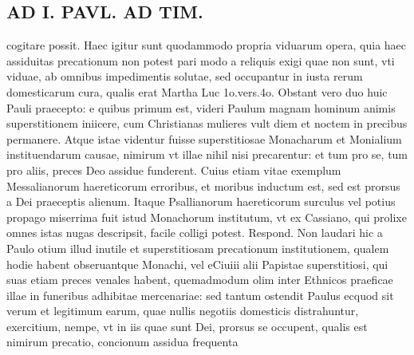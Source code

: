 \documentclass{article}
\begin{document}
\begin{pages}
\section*{AD I. PAVL. AD TIM. }
\marginpar{[ p.260 ]}\pstart cogitare possit. Haec igitur sunt quodammodo propria viduarum opera, quia haec assiduitas precationum non potest pari modo a reliquis exigi quae non sunt, vti viduae, ab omnibus impedimentis solutae, sed occupantur in iusta rerum domesticarum cura, qualis erat Martha Luc 1o.vers.4o. Obstant vero duo huic Pauli praecepto: e quibus primum est, videri Paulum magnam hominum animis superstitionem iniicere, cum Christianas mulieres vult diem et noctem in precibus permanere. Atque istae videntur fuisse superstitiosae Monacharum et Monialium instituendarum causae, nimirum vt illae nihil nisi precarentur: et tum pro se, tum pro aliis, preces Deo assidue funderent. Cuius etiam vitae exemplum Messalianorum haereticorum erroribus, et moribus inductum est, sed est prorsus a Dei praeceptis alienum. Itaque Psallianorum haereticorum surculus vel potius propago miserrima fuit istud Monachorum institutum, vt ex Cassiano, qui prolixe omnes istas nugas descripsit, facile colligi potest. Respond. Non laudari hic a Paulo otium illud inutile et superstitiosam precationum institutionem, qualem hodie habent obseruantque Monachi, vel eCiuiii alii Papistae superstitiosi, qui suas etiam preces venales habent, quemadmodum olim inter Ethnicos praeficae illae in funeribus adhibitae mercenariae: sed tantum ostendit Paulus ecquod sit verum et legitimum earum, quae nullis negotiis domesticis distrahuntur, exercitium, nempe, vt in iis quae sunt Dei, prorsus se occupent, qualis est nimirum precatio, concionum assidua frequenta\pend

\end{pages}
\end{document}
